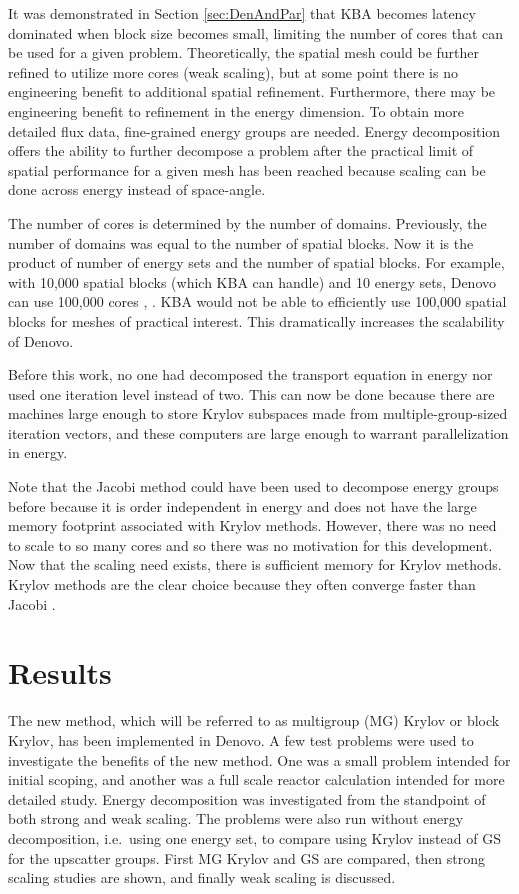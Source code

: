 It was demonstrated in Section \ref{sec:DenAndPar} that KBA becomes latency dominated when block size becomes small, limiting the number of cores that can be used for a given problem. Theoretically, the spatial mesh could be further refined to utilize more cores (weak scaling), but at some point there is no engineering benefit to additional spatial refinement. Furthermore, there may be engineering benefit to refinement in the energy dimension. To obtain more detailed flux data, fine-grained energy groups are needed. Energy decomposition offers the ability to further decompose a problem after the practical limit of spatial performance for a given mesh has been reached because scaling can be done across energy instead of space-angle. 

The number of cores is determined by the number of domains. Previously, the number of domains was equal to the number of spatial blocks. Now it is the product of number of energy sets and the number of spatial blocks. For example, with 10,000 spatial blocks (which KBA can handle) and 10 energy sets, Denovo can use 100,000 cores \cite{Evans2011}, \cite{Evans2010}. KBA would not be able to efficiently use 100,000 spatial blocks for meshes of practical interest. This dramatically increases the scalability of Denovo.

Before this work, no one had decomposed the transport equation in energy nor used one iteration level instead of two. This can now be done because there are machines large enough to store Krylov subspaces made from multiple-group-sized iteration vectors, and these computers are large enough to warrant parallelization in energy. 

Note that the Jacobi method could have been used to decompose energy groups before because it is order independent in energy and does not have the large memory footprint associated with Krylov methods. However, there was no need to scale to so many cores and so there was no motivation for this development. Now that the scaling need exists, there is sufficient memory for Krylov methods. Krylov methods are the clear choice because they often converge faster than Jacobi \cite{LeVeque2007}. 

\section{Results}
The new method, which will be referred to as multigroup (MG) Krylov or block Krylov, has been implemented in Denovo. A few test problems were used to investigate the benefits of the new method. One was a small problem intended for initial scoping, and another was a full scale reactor calculation intended for more detailed study. Energy decomposition was investigated from the standpoint of both strong and weak scaling. The problems were also run without energy decomposition, i.e.\ using one energy set, to compare using Krylov instead of GS for the upscatter groups. First MG Krylov and GS are compared, then strong scaling studies are shown, and finally weak scaling is discussed.

